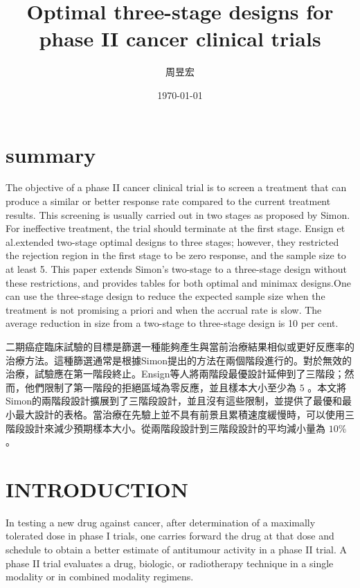 
\title{Optimal three-stage designs for phase II cancer clinical trials}
\author{{周昱宏}}
\date{{\TT \today}}

\maketitle
\fontsize{12}{22 pt}\selectfont
\doublespacing

\section{summary}
The objective of a phase II cancer clinical trial is to screen a treatment that can produce a similar or better response rate compared to the current treatment results. This screening is usually carried out in two stages as proposed by Simon. For ineffective treatment, the trial should terminate at the first stage. Ensign et al.extended two-stage optimal designs to three stages; however, they restricted the rejection region in the first stage to be zero response, and the sample size to at least 5. This paper extends Simon’s two-stage to a three-stage design without these restrictions, and provides tables for both optimal and minimax designs.One can use the three-stage design to reduce the expected sample size when the treatment is not promising a priori and when the accrual rate is slow. The average reduction in size from a two-stage to three-stage design is 10 per cent.  

二期癌症臨床試驗的目標是篩選一種能夠產生與當前治療結果相似或更好反應率的治療方法。這種篩選通常是根據Simon提出的方法在兩個階段進行的。對於無效的治療，試驗應在第一階段終止。Ensign等人將兩階段最優設計延伸到了三階段；然而，他們限制了第一階段的拒絕區域為零反應，並且樣本大小至少為 $5$ 。本文將Simon的兩階段設計擴展到了三階段設計，並且沒有這些限制，並提供了最優和最小最大設計的表格。當治療在先驗上並不具有前景且累積速度緩慢時，可以使用三階段設計來減少預期樣本大小。從兩階段設計到三階段設計的平均減小量為 $10\%$ 。

\section{INTRODUCTION}
In testing a new drug against cancer, after determination of a maximally tolerated dose in phase I trials, one carries forward the drug at that dose and schedule to obtain a better estimate of antitumour activity in a phase II trial. A phase II trial evaluates a drug, biologic, or radiotherapy technique in a single modality or in combined modality regimens.

